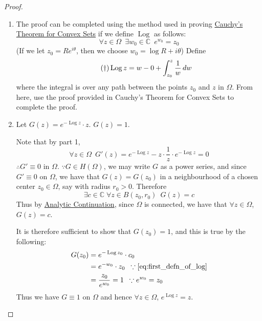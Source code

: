 \documentclass[11pt, oneside]{book}
\DeclareMathOperator{\Log}{Log}
\begin{document}
\begin{proof}
  \begin{enumerate}
    \item The proof can be completed using the method used in proving \hyperref[thm:cauchy_s_theorem_for_convex_set]{Cauchy's Theorem for Convex Sets} if we define $\Log$ as follows:
    \begin{equation*}
      \forall z \in \Omega \enspace \exists w_0 \in \mathbb{C} \enspace e^{w_0} = z_0
    \end{equation*}
    (If we let $z_0 = Re^{i \theta}$, then we choose $w_0 = \log R + i \theta$)
    Define
    \begin{equation}\tag{$\dagger$}\label{eq:first_defn_of_log}
      \Log z = w-0 + \int_{z_0}^{z} \frac{1}{w} \dif{w}
    \end{equation}
    where the integral is over any path between the points $z_0$ and $z$ in $\Omega$. From here, use the proof provided in Cauchy's Theorem for Convex Sets to complete the proof.
    
    \item Let $G(z) = e^{- \Log z} \cdot z$. \WTS $G(z) = 1$.

    Note that by part 1,
    \begin{equation*}
      \forall z \in \Omega \enspace G'(z) = e^{- \Log z} - z \cdot \frac{1}{z} \cdot e^{- \Log z} = 0
    \end{equation*}
    $\therefore G' \equiv 0$ in $\Omega$. $\because G \in H(\Omega)$, we may write $G$ as a power series, and since $G' \equiv 0$ on $\Omega$, we have that $G(z) = G(z_0)$ in a neighbourhood of a chosen center $z_0 \in \Omega$, say with radius $r_0 > 0$. Therefore
    \begin{equation*}
      \exists c \in \mathbb{C} \; \forall z \in B(z_0, r_0) \enspace G(z) = c
    \end{equation*}
    Thus by \hyperref[lemma:principle_of_analytic_continuation]{Analytic Continuation}, since $\Omega$ is connected, we have that $\forall z \in \Omega$, $G(z) = c$.

    It is therefore sufficient to show that $G(z_0) = 1$, and this is true by the following:
    \begin{align*}
      G(z_0) &= e^{- \Log z_0} \cdot c_0 \\
            &= e^{- w_0} \cdot z_0 \enspace \because \cref{eq:first_defn_of_log} \\
            &= \frac{z_0}{e^{w_0}} = 1 \enspace \because e^{w_0} = z_0 
    \end{align*}
    Thus we have $G \equiv 1$ on $\Omega$ and hence $\forall z \in \Omega$, $e^{\Log z} = z$.


\end{enumerate}
\end{proof}
\end{document}
